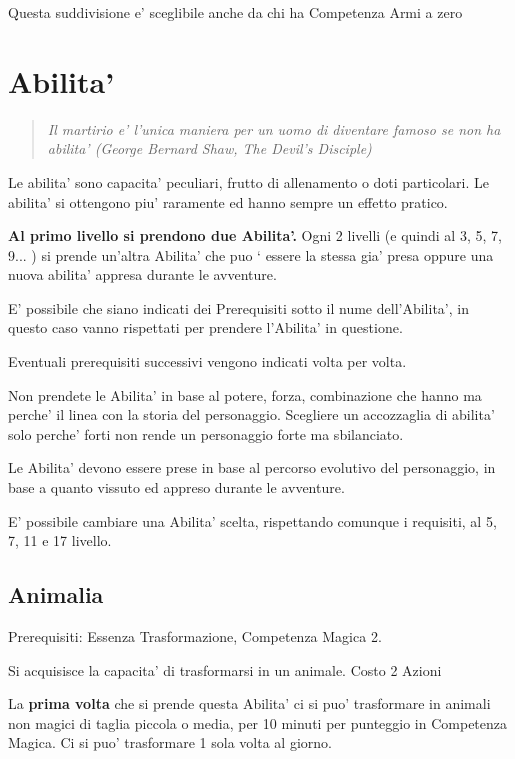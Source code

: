 \documentclass[a4paper,11pt,twoside,openany]{book}
\begin{document}
	Questa suddivisione e' sceglibile anche da chi ha Competenza Armi a zero 
	
	\pagebreak
	
	\section{Abilita'}
	
	\label{abilita}
	\begin{quote}\textit{
			Il martirio e' l'unica maniera per un uomo di diventare famoso se non ha abilita' (George Bernard Shaw, The Devil's Disciple)
	}\end{quote}
	
	Le abilita' sono capacita' peculiari, frutto di allenamento o doti particolari. Le abilita' si ottengono piu' raramente ed hanno sempre un effetto pratico.
	
	\textbf{Al primo livello si prendono due Abilita'.} Ogni 2 livelli (e quindi al 3, 5, 7, 9... ) si prende un'altra Abilita' che puo ` essere la stessa gia' presa oppure una nuova abilita' appresa durante le avventure.
	
	E' possibile che siano indicati dei Prerequisiti sotto il nume dell'Abilita', in questo caso vanno rispettati per prendere l'Abilita' in questione.
	
	Eventuali prerequisiti successivi vengono indicati volta per volta.
	
	Non prendete le Abilita' in base al potere, forza, combinazione che hanno ma perche' il linea con la storia del personaggio.
	Scegliere un accozzaglia di abilita' solo perche' forti non rende un personaggio forte ma sbilanciato. 
	
	\medskip
	Le Abilita' devono essere prese in base al percorso evolutivo del personaggio, in base a quanto vissuto ed appreso durante le avventure.
	\medskip
	
	E' possibile cambiare una Abilita' scelta, rispettando comunque i requisiti, al 5, 7, 11 e 17 livello.
	
	\subsection{Animalia}
	
	Prerequisiti: Essenza Trasformazione, Competenza Magica 2.
	
	Si acquisisce la capacita' di trasformarsi in un animale. Costo 2 Azioni
	
	La \textbf{prima volta} che si prende questa Abilita' ci si puo' trasformare in animali non magici di taglia piccola o media, per 10 minuti per punteggio in Competenza Magica. Ci si puo' trasformare 1 sola volta al giorno.
	
\end{document}
